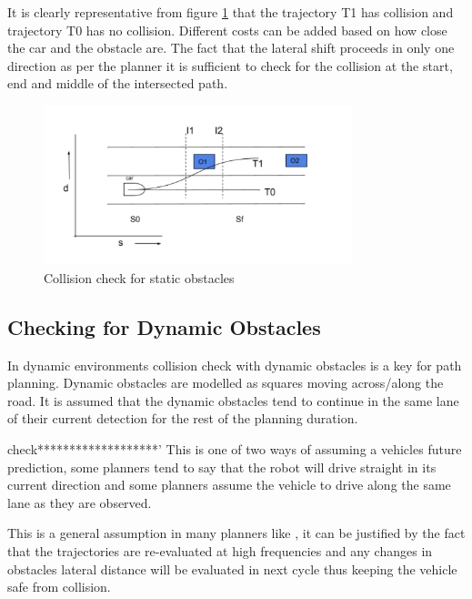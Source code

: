 It is clearly representative from figure \ref{static_check} that the trajectory T1 has collision and trajectory T0 has no collision. Different costs can be added based on how close the car and the obstacle are. The fact that the lateral shift proceeds in only one direction as per the planner it is sufficient to check for the collision at the start, end and middle of the intersected path. 


 \begin{figure}[H]
    \centering
    \includegraphics[width=0.8\textwidth]{Images/static_check.png}
    \caption{Collision check for static obstacles}
    \label{static_check}
\end{figure}



\subsection{Checking for Dynamic Obstacles} \label{obstacle_check_dynamic}

In dynamic environments collision check with dynamic obstacles is a key for path planning. Dynamic obstacles are modelled as squares moving across/along the road. It is assumed that the dynamic obstacles tend to continue in the same lane of their current detection for the rest of the planning duration. 

check*******************'
This is one of two ways of assuming a vehicles future prediction, some planners tend to say that the robot will drive straight in its current direction  and some planners assume the vehicle to drive along the same lane as they are observed. 

This is a general assumption in many planners like \cite{unit_A_star}, it can be justified by the fact that the trajectories are re-evaluated at high frequencies and any changes in obstacles lateral distance will be evaluated in next cycle thus keeping the vehicle safe from collision. 

